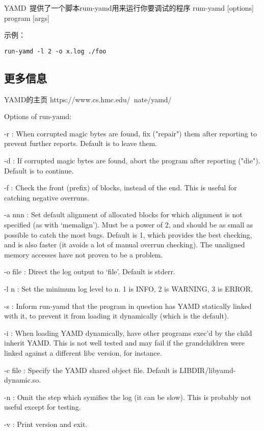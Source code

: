 YAMD~提供了一个脚本rum-yamd用来运行你要调试的程序
rum-yamd [options] program [args]

示例：
\begin{lstlisting}
run-yamd -l 2 -o x.log ./foo
\end{lstlisting}

\subsection{更多信息}

  YAMD的主页
    https://www.cs.hmc.edu/~nate/yamd/

  Options of run-yamd:

  -r : When corrupted magic bytes are found, fix ("repair") them after
   reporting to prevent further reports.  Default is to leave them.

  -d : If corrupted magic bytes are found, abort the program after
   reporting ("die").  Default is to continue.

  -f : Check the front (prefix) of blocks, instead of the end.  This
   is useful for catching negative overruns.

  -a nnn : Set default alignment of allocated blocks for which
   alignment is not specified (as with `memalign').  Must be a power
   of 2, and should be as small as possible to catch the most bugs.
   Default is 1, which provides the best checking, and is also faster
   (it avoids a lot of manual overrun checking).  The unaligned memory
   accesses have not proven to be a problem.

  -o file : Direct the log output to `file'.  Default is stderr.

  -l n : Set the minimum log level to n.  1 is INFO, 2 is WARNING, 3
   is ERROR.

  -s : Inform run-yamd that the program in question has YAMD
   statically linked with it, to prevent it from loading it
   dynamically (which is the default).

  -i : When loading YAMD dynamically, have other programs exec'd by
   the child inherit YAMD.  This is not well tested and may fail if
   the grandchildren were linked against a different libc version, for
   instance.

  -c file : Specify the YAMD shared object file.  Default is
   LIBDIR/libyamd-dynamic.so.

  -n : Omit the step which symifies the log (it can be slow).  This is
   probably not useful except for testing.

  -v : Print version and exit.

